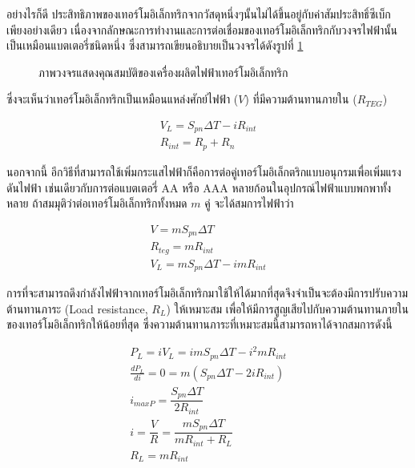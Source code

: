 \documentclass[a4paper,nobib,openany]{tufte-book}
\begin{document}
อย่างไรก็ดี
ประสิทธิภาพของเทอร์โมอิเล็กทริกจากวัสดุหนึ่งๆนั้นไม่ได้ขึ้นอยู่กับค่าสัมประสิทธิ์ซีเบ็กเพียงอย่างเดียว
เนื่องจากลักษณะการทำงานและการต่อเชื่อมของเทอร์โมอิเล็กทริกกับวงจรไฟฟ้านั้นเป็นเหมือนแบตเตอรี่ชนิดหนึ่ง
ซึ่งสามารถเขียนอธิบายเป็นวงจรได้ดังรูปที่ \ref{fig: thermoelectric circuit}

\begin{figure}[h]
  \centering
\caption{\label{fig: thermoelectric circuit}ภาพวงจรแสดงคุณสมบัติของเครื่องผลิตไฟฟ้าเทอร์โมอิเล็กทริก}
\end{figure}

ซึ่งจะเห็นว่าเทอร์โมอิเล็กทริกเป็นเหมือนแหล่งศักย์ไฟฟ้า (\(V\))
ที่มีความต้านทานภายใน (\(R_{TEG}\))

\[\begin{gathered}
  V_L = S_{pn}\Delta T - iR_{int} \\
  R_{int} = R_p + R_n\end{gathered}\]

นอกจากนี้
อีกวิธีที่สามารถใช้เพิ่มกระแสไฟฟ้าก็คือการต่อคู่เทอร์โมอิเล็กตริกแบบอนุกรมเพื่อเพิ่มแรงดันไฟฟ้า
เช่นเดียวกับการต่อแบตเตอรี่ AA หรือ AAA
หลายก้อนในอุปกรณ์ไฟฟ้าแบบพกพาทั้งหลาย
ถ้าสมมุติว่าต่อเทอร์โมอิเล็กทริกทั้งหมด \(m\) คู่ จะได้สมการไฟฟ้าว่า

\[\begin{gathered}
  V = m S_{pn} \Delta T \\
  R_{teg} = m R_{int} \\
  V_L = m S_{pn} \Delta T - i mR_{int}\end{gathered}\]

การที่จะสามารถดึงกำลังไฟฟ้าจากเทอร์โมอิเล็กทริกมาใช้ให้ได้มากที่สุดจึงจำเป็นจะต้องมีการปรับความต้านทานภาระ
(Load resistance, \(R_L\)) ให้เหมาะสม
เพื่อให้มีการสูญเสียไปกับความต้านทานภายในของเทอร์โมอิเล็กทริกให้น้อยที่สุด
ซึ่งความต้านทานภาระที่เหมาะสมนี้สามารถหาได้จากสมการดังนี้

\[\begin{gathered}
  P_L = iV_L = i m S_{pn} \Delta T - i^2 m R_{int} \\
  \frac{d P_L}{d i } = 0 = m(S_{pn} \Delta T - 2 i R_{int}) \\
  i_{max P} = \dfrac{S_{pn} \Delta T}{2 R_{int}} \\
  i = \dfrac{V}{R} = \dfrac{ m S_{pn} \Delta T }{ m R_{int} + R_L } \\
  R_L = m R_{int}\end{gathered}\]
\end{document}
